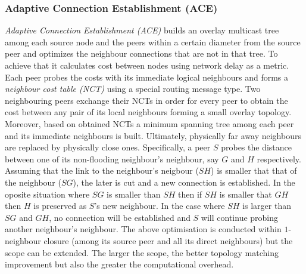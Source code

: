 \subsubsection{Adaptive Connection Establishment (ACE)}
\emph{Adaptive Connection Establishment (ACE)} \cite{LZXN2004} builds an
overlay multicast tree among each source node and the peers within a certain
diameter from the source peer and optimizes the neighbour connections that are
not in that tree. To achieve that it calculates cost between nodes using network
delay as a metric. Each peer probes the costs with its immediate logical
neighbours and forms a \emph{neighbour cost table (NCT)} using a special
routing message type. Two neighbouring peers exchange their NCTs in order for
every peer to obtain the cost between any pair of its local neighbours forming a
small overlay topology. Moreover, based on obtained NCTs a minimum spanning tree
among each peer and its immediate neighbours is built. Ultimately, physically
far away neighbours are replaced by physically close ones. Specifically, a peer
$S$ probes the distance between one of its non-flooding neighbour's neighbour,
say $G$ and $H$ respectively. Assuming that the link to the neighbour's neigbour
($SH$) is smaller that that of the neighbour ($SG$), the later is cut and a new
connection is established. In the oposite situation where $SG$ is smaller than
$SH$ then if $SH$ is smaller that $GH$ then $H$ is preserved as $S$'s new
neighbour. In the case where $SH$ is larger than $SG$ and $GH$, no connection
will be established and $S$ will continue probing another neighbour's neighbour.
The above optimisation is conducted within $1$-neighbour closure (among its
source peer and all its direct neighbours) but the scope can be extended. The
larger the scope, the better topology matching improvement but also the greater
the computational overhead.

%
%
%

